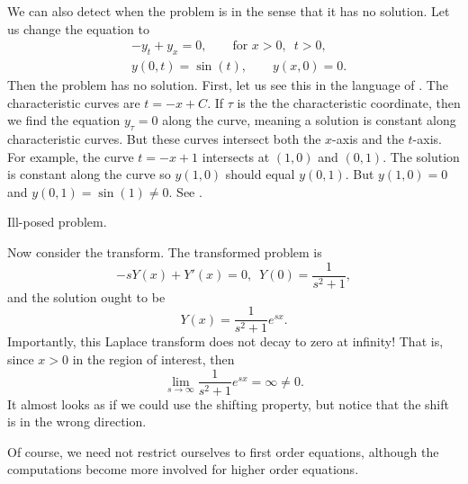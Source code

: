 We can also detect when the problem is
\emph{}
in the sense that it has no solution.
Let us change the equation to
\begin{align*}
& -y_t + y_x = 0, \qquad \text{for } x > 0, \enspace t > 0,
\\
& y(0,t) = \sin(t), \qquad y(x,0) = 0 .
\end{align*}
Then the problem
has no solution.  First, let us see this in the language of
.
The characteristic curves are $t=-x+C$.  If $\tau$ is the
the characteristic coordinate, then we find the equation $y_\tau = 0$
along the curve,
meaning a solution is constant along characteristic curves.
But these curves intersect both the $x$-axis and the $t$-axis.
For example,
the curve $t=-x+1$ intersects at $(1,0)$ and $(0,1)$.  The solution is
constant along the curve so $y(1,0)$ should equal $y(0,1)$.  But
$y(1,0) = 0$ and $y(0,1) = \sin(1) \not= 0$.
See .

\begin{myfig}
\capstart
{}
\caption{Ill-posed problem.\label{lt:half-infinite-ill-posed}}
\end{myfig}

Now consider the transform.  The transformed problem is
\begin{equation*}
-sY(x) + Y'(x) = 0, \enspace Y(0) = \frac{1}{s^2+1} ,
\end{equation*}
and the solution ought to be
\begin{equation*}
Y(x) = \frac{1}{s^2+1} e^{sx} .
\end{equation*}
Importantly, this Laplace transform does not decay to zero at infinity!  That is,
since $x > 0$ in the region of interest, then
\begin{equation*}
\lim_{s \to \infty}
\frac{1}{s^2+1} e^{sx}
= \infty \not= 0 .
\end{equation*}
It almost
looks as if we could use the shifting property, but notice that the shift
is in the wrong direction.

\medskip

Of course, we need not restrict ourselves to first order equations, although
the computations become more involved for higher order equations.

